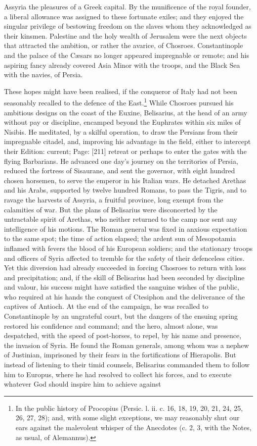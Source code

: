 Assyria the pleasures of a Greek capital. By the munificence of the royal founder, a liberal allowance was assigned to these fortunate exiles; and they enjoyed the singular privilege of bestowing freedom on the slaves whom they acknowledged as their kinsmen. Palestine and the holy wealth of Jerusalem were the next objects that attracted the ambition, or rather the avarice, of Chosroes. Constantinople and the palace of the Cæsars no longer appeared impregnable or remote; and his aspiring fancy already covered Asia Minor with the troops, and the Black Sea with the navies, of Persia.

These hopes might have been realised, if the conqueror of Italy had not been seasonably recalled to the defence of the East.\footnote{In the public history of Procopius (Persic. l. ii. c. 16, 18, 19, 20, 21, 24, 25, 26, 27, 28); and, with some slight exceptions, we may reasonably shut our ears against the malevolent whisper of the Anecdotes (c. 2, 3, with the Notes, as usual, of Alemannus).} While Chosroes pursued his ambitious designs on the coast of the Euxine, Belisarius, at the head of an army without pay or discipline, encamped beyond the Euphrates within six miles of Nisibis. He meditated, by a skilful operation, to draw the Persians from their impregnable citadel, and, improving his advantage in the field, either to intercept their Edition: current; Page: [211] retreat or perhaps to enter the gates with the flying Barbarians. He advanced one day\texthebrew{}’s journey on the territories of Persia, reduced the fortress of Sisaurane, and sent the governor, with eight hundred chosen horsemen, to serve the emperor in his Italian wars. He detached Arethas and his Arabs, supported by twelve hundred Romans, to pass the Tigris, and to ravage the harvests of Assyria, a fruitful province, long exempt from the calamities of war. But the plans of Belisarius were disconcerted by the untractable spirit of Arethas, who neither returned to the camp nor sent any intelligence of his motions. The Roman general was fixed in anxious expectation to the same spot; the time of action elapsed; the ardent sun of Mesopotamia inflamed with fevers the blood of his European soldiers; and the stationary troops and officers of Syria affected to tremble for the safety of their defenceless cities. Yet this diversion had already succeeded in forcing Chosroes to return with loss and precipitation; and, if the skill of Belisarius had been seconded by discipline and valour, his success might have satisfied the sanguine wishes of the public, who required at his hands the conquest of Ctesiphon and the deliverance of the captives of Antioch. At the end of the campaign, he was recalled to Constantinople by an ungrateful court, but the dangers of the ensuing spring restored his confidence and command; and the hero, almost alone, was despatched, with the speed of post-horses, to repel, by his name and presence, the invasion of Syria. He found the Roman generals, among whom was a nephew of Justinian, imprisoned by their fears in the fortifications of Hierapolis. But instead of listening to their timid counsels, Belisarius commanded them to follow him to Europus, where he had resolved to collect his forces, and to execute whatever God should inspire him to achieve against 